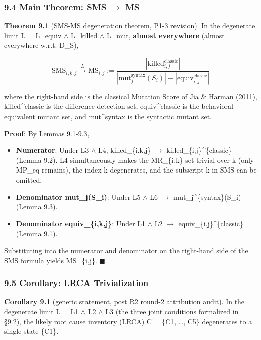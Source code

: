 \documentclass[review,12pt,authoryear]{elsarticle}
\providecommand{\tightlist}{\setlength{\itemsep}{0pt}\setlength{\parskip}{0pt}}
\begin{document}
\subsubsection{9.4 Main Theorem: SMS $\to$ MS}\label{main-theorem-sms-ms}

\textbf{Theorem 9.1} (SMS-MS degeneration theorem, P1-3 revision). In
the degenerate limit L = L\_equiv $\wedge$ L\_killed $\wedge$ L\_mut, \textbf{almost
everywhere} (almost everywhere w.r.t. D\_S),

\[
\text{SMS}_{i,k,j} \xrightarrow{L} \text{MS}_{i,j} := \frac{|\text{killed}_{i,j}^{\text{classic}}|}{|\text{mut}_j^{\text{syntax}}(S_i)| - |\text{equiv}_{i,j}^{\text{classic}}|}
\]

where the right-hand side is the classical Mutation Score of Jia \&
Harman (2011), killed\^{}classic is the difference detection set,
equiv\^{}classic is the behavioral equivalent mutant set, and
mut\^{}syntax is the syntactic mutant set.

\textbf{Proof}: By Lemmas 9.1-9.3,

\begin{itemize}
\tightlist
\item
  \textbf{Numerator}: Under L3 $\wedge$ L4, killed\_\{i,k,j\} $\to$
  killed\_\{i,j\}\^{}\{classic\} (Lemma 9.2). L4 simultaneously makes
  the MR\_\{i,k\} set trivial over k (only MP\_eq remains), the index k
  degenerates, and the subscript k in SMS can be omitted.
\item
  \textbf{Denominator \textbar mut\_j(S\_i)\textbar{}}: Under L5 $\wedge$ L6 $\to$
  \textbar mut\_j\^{}\{syntax\}(S\_i)\textbar{} (Lemma 9.3).
\item
  \textbf{Denominator \textbar equiv\_\{i,k,j\}\textbar{}}: Under L1 $\wedge$
  L2 $\to$ \textbar equiv\_\{i,j\}\^{}\{classic\}\textbar{} (Lemma 9.1).
\end{itemize}

Substituting into the numerator and denominator on the right-hand side
of the SMS formula yields MS\_\{i,j\}. $\blacksquare$

\subsubsection{9.5 Corollary: LRCA
Trivialization}\label{corollary-lrca-trivialization}

\textbf{Corollary 9.1} (generic statement, post R2 round-2 attribution
audit). In the degenerate limit L = L1 $\wedge$ L2 $\wedge$ L3 (the three joint
conditions formalized in §9.2), the likely root cause inventory (LRCA) C
= \{C1, \ldots, C5\} degenerates to a single state \{C1\}.
\end{document}
